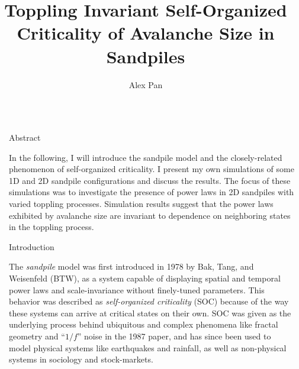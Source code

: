 \documentclass[final]{beamer}
\title{Toppling Invariant Self-Organized Criticality of Avalanche Size in Sandpiles} %
\author{Alex Pan} %
\institute{Reed College} %
\newlength{\sepwid}
\newlength{\onecolwid}
\begin{document}

\setlength{\belowcaptionskip}{1ex} %
\setlength\belowdisplayshortskip{2ex} %

\begin{frame}[t] %

\begin{columns}[t] %

\begin{column}{\sepwid}\end{column} %

\begin{column}{\onecolwid} %


\begin{alertblock}{Abstract}

In the following, I will introduce the sandpile model and the closely-related phenomenon of self-organized criticality. I present my own simulations of some 1D and 2D sandpile configurations and discuss the results. The focus of these simulations was to investigate the presence of power laws in 2D sandpiles with varied toppling processes. Simulation results suggest that the power laws exhibited by avalanche size are invariant to dependence on neighboring states in the toppling process. 

\end{alertblock}


\begin{block}{Introduction}

The \textit{sandpile} model was first introduced in 1978 by Bak, Tang, and Weisenfeld (BTW),  as a system capable of displaying spatial and temporal power laws and scale-invariance without finely-tuned parameters. This behavior was described as \textit{self-organized criticality} (SOC) because of the way these systems can arrive at critical states on their own. SOC was given as the underlying process behind ubiquitous and complex phenomena like fractal geometry and ``$1/f$'' noise in the 1987 paper, and has since been used to model physical systems like earthquakes and rainfall, as well as non-physical systems in sociology and stock-markets.


\end{block}
\end{column}
\end{columns}
\end{frame}
\end{document}
